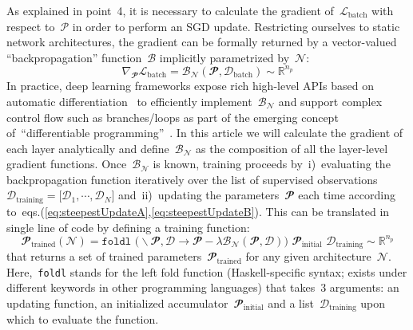 \documentclass{article}
\begin{document}
{As explained in point~4, it is necessary to calculate the gradient of~$\mathcal{L}_\text{batch}$ with respect to~$\mathcal{P}$ in order to perform an SGD update. Restricting ourselves to static network architectures, the gradient can be formally returned by a vector-valued ``backpropagation'' function~$\mathcal{B}$ implicitly parametrized by~$\mathcal{N}$:
\begin{equation*}
\nabla_\mathbfcal{P} \mathcal{L}_\text{batch} = \mathcal{B}_\mathcal{N} \left( \mathbfcal{P} , \mathcal{D}_\text{batch} \right) \sim \mathbb{R}^{n_p}
\end{equation*}
In practice, deep learning frameworks expose rich high-level APIs based on automatic \mbox{differentiation}~\cite{pearlmutter} to efficiently implement~$\mathcal{B}_\mathcal{N}$ and support complex control flow such as branches/loops as part of the emerging concept of~``differentiable programming''~\cite{RAD,differentiableProgramming}.  In this article we will calculate the gradient of each layer analytically and define~$\mathcal{B}_\mathcal{N}$ as the composition of all the layer-level gradient functions.  Once~$\mathcal{B}_\mathcal{N}$ is known, training proceeds by~i)~evaluating the backpropagation function iteratively over the list of supervised observations~$\mathcal{D}_\text{training} = \lbrack \mathcal{D}_1, \cdots , \mathcal{D}_N \rbrack$ and~ii)~updating the parameters~$\mathbfcal{P}$ each time according to~eqs.(\ref{eq:steepestUpdateA},\ref{eq:steepestUpdateB}).  This can be translated in single line of code by defining a training function:
\begin{equation*}
\mathbfcal{P}_\text{trained} \left( \mathcal{N} \right) = \texttt{foldl} \,\, \Big(\backslash \mathbfcal{P}, \mathcal{D} \rightarrow \mathbfcal{P} - \lambda \mathcal{B}_\mathcal{N} \left( \mathbfcal{P} , \mathcal{D} \right)  \Big) \,\, \mathbfcal{P}_\text{initial} \,\, \mathcal{D}_\text{training} \sim \mathbb{R}^{n_p}
\end{equation*}
that returns a set of trained parameters~$\mathbfcal{P}_\text{trained}$ for any given architecture~$\mathcal{N}$.  Here,~\texttt{foldl} stands for the left fold function (Haskell-specific syntax; exists under different keywords in other programming languages) that takes~3 arguments: an updating function, an initialized accumulator~$\mathbfcal{P}_\text{initial}$ and a list~$\mathcal{D}_\text{training}$ upon which to evaluate the function.

\endminipage}

\vspace{1cm}
\end{document}
